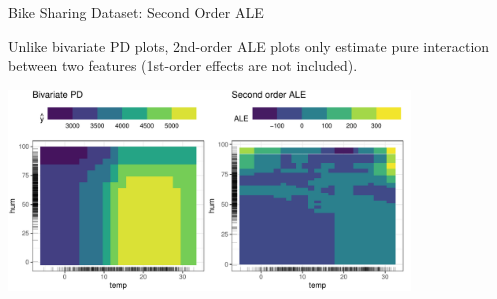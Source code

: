 \documentclass[11pt,compress,t,notes=noshow, aspectratio=169, xcolor=table]{beamer}
\begin{document}
\begin{frame}{Bike Sharing Dataset: Second Order ALE}

Unlike bivariate PD plots, 2nd-order ALE plots only estimate pure interaction between two features (1st-order effects are not included).

\vspace{0.1cm}

\begin{center}
\includegraphics[width=0.8\textwidth]{figure/ale2d}
\end{center}

\end{frame}



\end{document}
